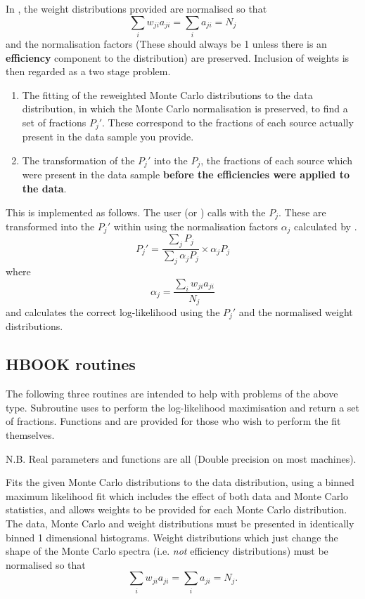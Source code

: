 In , the weight distributions provided are normalised
so that
\[\sum_i w_{ji}a_{ji} = \sum_i a_{ji} = N_{j}\]
 and the
normalisation factors (These should always be 1 unless there is an
{\bf efficiency} component to the distribution) are preserved.  Inclusion
of weights is then regarded as a two stage problem.
\begin{enumerate}
\item  The fitting
of the reweighted Monte Carlo distributions to the data distribution, in
which the Monte Carlo normalisation is preserved, to find a set of fractions
$P_{j}\prime$.  These correspond to the fractions of each source
actually present in the data sample you provide.
\item The transformation of the $P_{j}\prime$ into the $P_j$, the fractions
of each source which were present in the data sample {\bf before the
efficiencies were applied to the data}.
\end{enumerate}
 
This is implemented as follows.
The user (or ) calls  with the $P_j$.  These are transformed
into the $P_{j}\prime$ within  using the normalisation factors
$\alpha_j$ calculated by .
\[ 
   P_{j}\prime = \frac{\sum_j P_j}{\sum_j \alpha_j P_j} \times
   \alpha_j P_j
\]
where
\[
   \alpha_j = \frac{\sum_i w_{ji} a_{ji}}{N_j}
\]
and  calculates the correct log-likelihood using the $P_{j}\prime$
and the normalised weight distributions.
 
\subsection*{HBOOK routines}
 
The following three routines are intended to help with problems of the
above type.  Subroutine
 uses \MINUIT{} to perform the log-likelihood maximisation and
return a set of fractions.  Functions  and  are
provided for those who wish to perform the fit themselves.
 
N.B. Real parameters and functions are all 
(Double precision on most machines).
 
 
\Action
Fits the given Monte Carlo distributions to the data distribution, using
a binned maximum likelihood fit which includes the effect of both data and
Monte Carlo statistics, and allows weights to be
provided for each Monte Carlo distribution.  The data, Monte Carlo and weight
distributions must be presented in identically binned 1 dimensional histograms.
Weight distributions which just change the shape of the Monte Carlo spectra
(i.e. \emph{not} efficiency distributions) must be normalised so that
\[  \sum_i w_{ji}a_{ji} = \sum_i a_{ji} = N_{j}.\]

